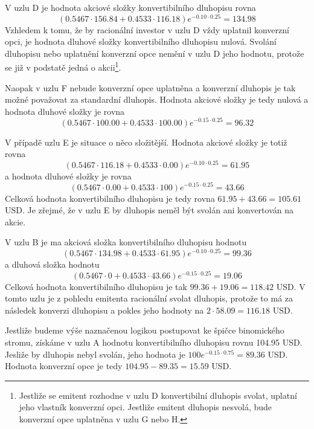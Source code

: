 \documentclass[a4paper]{book}
\begin{document}
V uzlu D je hodnota akciové složky konvertibilního dluhopisu rovna
\begin{equation*}
(0.5467 \cdot 156.84 + 0.4533 \cdot 116.18)e^{-0.10 \cdot 0.25} = 134.98
\end{equation*}
Vzhledem k tomu, že by racionální investor v uzlu D vždy uplatnil konverzní opci, je hodnota dluhové složky konvertibilního dluhopisu nulová. Svolání dluhopisu nebo uplatnění konverzní opce nemění v uzlu D jeho hodnotu, protože se již v podstatě jedná o akcii\footnote{Jestliže se emitent rozhodne v uzlu D konvertibilní dluhopis svolat, uplatní jeho vlastník konverzní opci. Jestliže emitent dluhopis nesvolá, bude konverzní opce uplatněna v uzlu G nebo H.}.

Naopak v uzlu F nebude konverzní opce uplatněna a konverzní dluhopis je tak možné považovat za standardní dluhopis. Hodnota akciové složky je tedy nulová a hodnota dluhové složky je rovna
\begin{equation*}
(0.5467 \cdot 100.00 + 0.4533 \cdot 100.00)e^{-0.15 \cdot 0.25} = 96.32
\end{equation*}

V případě uzlu E je situace o něco složitější. Hodnota akciové složky je totiž rovna
\begin{equation*}
(0.5467 \cdot 116.18 + 0.4533 \cdot 0.00)e^{-0.10 \cdot 0.25} = 61.95
\end{equation*}
a hodnota dluhové složky je rovna
\begin{equation*}
(0.5467 \cdot 0.00 + 0.4533 \cdot 100)e^{-0.15 \cdot 0.25} = 43.66
\end{equation*}
Celková hodnota konvertibilního dluhopisu je tedy rovna $61.95 + 43.66 = 105.61$ USD. Je zřejmé, že v uzlu E by dluhopis neměl být svolán ani konvertován na akcie.

V uzlu B je ma akciová složka konvertibilního dluhopisu hodnotu
\begin{equation*}
(0.5467 \cdot 134.98 + 0.4533 \cdot 61.95)e^{-0.10 \cdot 0.25} = 99.36
\end{equation*}
a dluhová složka hodnotu
\begin{equation*}
(0.5467 \cdot 0 + 0.4533 \cdot 43.66)e^{-0.15 \cdot 0.25} = 19.06
\end{equation*}
Celková hodnota konvertibilního dluhopisu je tak $99.36 + 19.06 = 118.42$ USD. V tomto uzlu je z pohledu emitenta racionální svolat dluhopis, protože to má za následek konverzi dluhopisu a pokles jeho hodnoty na $2 \cdot 58.09 = 116.18$ USD.

Jestliže budeme výše naznačenou logikou postupovat ke špičce binomického stromu, získáme v uzlu A hodnotu konvertibilního dluhopisu rovnu 104.95 USD. Jesliže by dluhopis nebyl svolán, jeho hodnota je $100e^{-0.15 \cdot 0.75} = 89.36$ USD. Hodnota konverzní opce je tedy $104.95 - 89.35 = 15.59$ USD.
\end{document}
